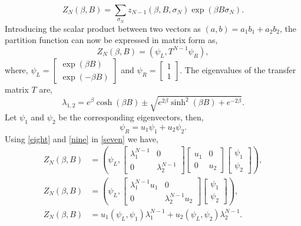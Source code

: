 \documentclass[letterpaper,english,12pt]{article}
\begin{document}
$$Z_{N}(\beta,B)=\sum_{\sigma_{N}}z_{N-1}(\beta,B,\sigma_{N})\exp(\beta B\sigma_{N}).$$
Introducing the scalar product between two vectors as $(a,b) = a_{1}b_{1}+a_{2}b_{2}$, the partition function can now be expressed in matrix form as,
\begin{equation}
Z_{N}(\beta,B) = (\psi_{L},T^{N-1}\psi_{R}),
\label{seven}
\end{equation}
where, $\psi_{L} = \begin{bmatrix}  \exp(\beta B)\\ \exp(-\beta B)\end{bmatrix}$ and $\psi_{R} = \begin{bmatrix} 1\\ 1\end{bmatrix}$. The eigenvalues of the transfer matrix $T$ are,
\begin{equation}
\lambda_{1,2} = e^{\beta}\cosh(\beta B)\pm \sqrt{e^{2\beta} \sinh^{2}(\beta B) + e^{-2\beta}}.
\label{eight}
 \end{equation}
Let $\psi_{1}$ and $\psi_{2}$ be the corresponding eigenvectors, then, 
 \begin{equation}
\psi_{R} = u_{1}\psi_{1}+u_{2}\psi_{2}.
\label{nine}
 \end{equation}
 Using \eqref{eight} and \eqref{nine} in \eqref{seven} we have,
 \begin{align}
Z_{N}(\beta,B) &= \left(\psi_{L}, 
\begin{bmatrix}
	\lambda_{1}^{N-1} & 0 \\
	0 & \lambda_{2}^{N-1} 
	\end{bmatrix}\begin{bmatrix}
	u_{1} & 0 \\
	0 & u_{2} 
	\end{bmatrix}\begin{bmatrix} \psi_{1}\\ \psi_{2}\end{bmatrix} \right),\nonumber\\
Z_{N}(\beta,B) &= \left(\psi_{L}, 
\begin{bmatrix}
	\lambda_{1}^{N-1}u_{1} & 0 \\
	0 & \lambda_{2}^{N-1}u_{2} 
	\end{bmatrix}\begin{bmatrix} \psi_{1}\\ \psi_{2}\end{bmatrix} \right),\nonumber\\
Z_{N}(\beta,B) &= u_{1}(\psi_{L},\psi_{1})\lambda_{1}^{N-1}+u_{2}(\psi_{L},\psi_{2})\lambda_{2}^{N-1}.
\label{ten}
\end{align}
\end{document}
